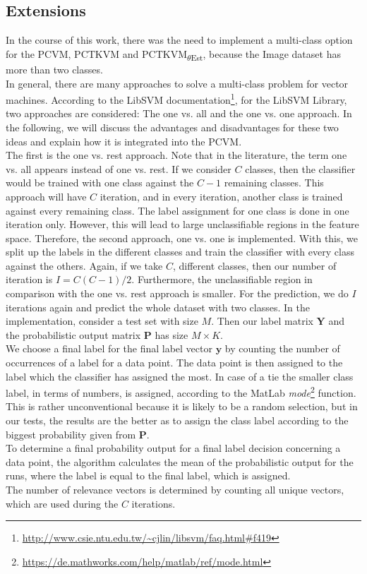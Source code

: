 \subsection{Extensions}\label{InSubSecExt}
In the course of this work, there was the need to implement a multi-class option for the \acs{PCVM}, \acs{PCTKVM} and \acs{PCTKVM}\textsubscript{$\theta$Est}, because the Image dataset has more than two classes.\\
In general, there are many approaches to solve a multi-class problem for vector machines.\cite[p. 113]{Abe.2010}
According to the LibSVM documentation\footnote{\url{http://www.csie.ntu.edu.tw/~cjlin/libsvm/faq.html\#f419}}, for the LibSVM Library, two approaches are considered: The one vs. all and the one vs. one approach.
In the following, we will discuss the advantages and disadvantages for these two ideas and explain how it is integrated into the \acs{PCVM}.\\
The first is the one vs. rest approach.
Note that in the literature, the term one vs. all appears instead of one vs. rest.
If we consider $C$ classes, then the classifier would be trained with one class against the $C-1$ remaining classes.
This approach will have $C$ iteration, and in every iteration, another class is trained against every remaining class.
The label assignment for one class is done in one iteration only.
However, this will lead to large unclassifiable regions in the feature space.\cite[p. 114-116]{Abe.2010}\newline
Therefore, the second approach, one vs. one is implemented.
With this, we split up the labels in the different classes and train the classifier with every class against the others.
Again, if we take $C$, different classes, then our number of iteration is $I=C(C-1)/2$.
Furthermore, the unclassifiable region in comparison with the one vs. rest approach is smaller.
For the prediction, we do $I$ iterations again and predict the whole dataset with two classes.\cite[p. 127-128]{Abe.2010}\newline
In the implementation, consider a test set with size $M$.
Then our label matrix $\mathbf{Y}$ and the probabilistic output matrix $\mathbf{P}$ has size $M\times K$.\\
We choose a final label for the final label vector $\mathbf{y}$ by counting the number of occurrences of a label for a data point.
The data point is then assigned to the label which the classifier has assigned the most.
In case of a tie the smaller class label, in terms of numbers, is assigned, according to the MatLab \textit{mode}\footnote{\url{https://de.mathworks.com/help/matlab/ref/mode.html}} function.
This is rather unconventional because it is likely to be a random selection, but in our tests, the results are the better as to assign the class label according to the biggest probability given from $\mathbf{P}$.\\
To determine a final probability output for a final label decision concerning a data point, the algorithm calculates the mean of the probabilistic output for the runs, where the label is equal to the final label, which is assigned.\\
The number of relevance vectors is determined by counting all unique vectors, which are used during the $C$ iterations.

